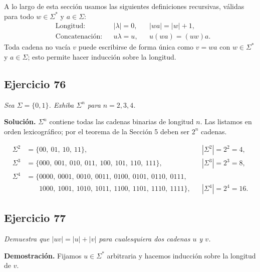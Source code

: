 
\noindent A lo largo de esta sección usamos las siguientes definiciones recursivas,
válidas para todo $w \in \Sigma^*$ y $a \in \Sigma$:
\[
\begin{aligned}
    &\text{Longitud:}      && |\lambda| = 0, && |wa| = |w| + 1, \\
    &\text{Concatenación:} && u\lambda = u,  && u(wa) = (uw)a .
\end{aligned}
\]
Toda cadena no vacía $v$ puede escribirse de forma única como $v = wa$ con
$w \in \Sigma^*$ y $a \in \Sigma$; esto permite hacer inducción sobre la longitud.

\subsection*{Ejercicio 76}

\noindent\textit{Sea $\Sigma = \{0, 1\}$. Exhiba $\Sigma^n$ para $n = 2, 3, 4$.}

\medskip
\noindent\textbf{Solución.} $\Sigma^n$ contiene todas las cadenas binarias de
longitud $n$. Las listamos en orden lexicográfico; por el teorema de la
Sección 5 deben ser $2^n$ cadenas.

\begin{align*}
    \Sigma^2 &= \{00,\ 01,\ 10,\ 11\}, && |\Sigma^2| = 2^2 = 4, \\[4pt]
    \Sigma^3 &= \{000,\ 001,\ 010,\ 011,\ 100,\ 101,\ 110,\ 111\}, && |\Sigma^3| = 2^3 = 8, \\[4pt]
    \Sigma^4 &= \{0000,\ 0001,\ 0010,\ 0011,\ 0100,\ 0101,\ 0110,\ 0111, && \\
    &\phantom{= \{} 1000,\ 1001,\ 1010,\ 1011,\ 1100,\ 1101,\ 1110,\ 1111\}, && |\Sigma^4| = 2^4 = 16.
\end{align*}

\subsection*{Ejercicio 77}

\noindent\textit{Demuestra que $|uv| = |u| + |v|$ para cualesquiera dos cadenas $u$ y $v$.}

\medskip
\noindent\textbf{Demostración.} Fijamos $u \in \Sigma^*$ arbitraria y hacemos
inducción sobre la longitud de $v$.

